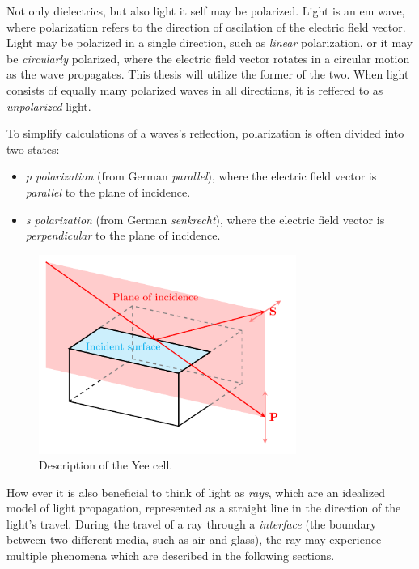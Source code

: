 Not only dielectrics, but also light it self may be polarized. Light is an \gls{em} wave, where polarization refers to the direction of oscilation of the electric field vector. Light may be polarized in a single direction, such as \emph{linear} polarization, or it may be \emph{circularly} polarized, where the electric field vector rotates in a circular motion as the wave propagates. This thesis will utilize the former of the two. When light consists of equally many polarized waves in all directions, it is reffered to as \emph{unpolarized} light. 

To simplify calculations of a waves's reflection, polarization is often divided into two states:
\begin{itemize}
  \item \emph{p polarization} (from German \emph{parallel}), where the electric field vector is \emph{parallel} to the plane of incidence.
  \item \emph{s polarization} (from German \emph{senkrecht}), where the electric field vector is \emph{perpendicular} to the plane of incidence.
\end{itemize}

\begin{figure}[H]\label{fig:polarization}
  \centering
  \includegraphics[width=0.75\textwidth]{figures/polarization.pdf}
  \caption{Description of the Yee cell.}
\end{figure}


How ever it is also beneficial to think of light as \emph{rays}, which are an idealized model of light propagation, represented as a straight line in the direction of the light's travel. During the travel of a ray through a \emph{interface} (the boundary between two different media, such as air and glass), the ray may experience multiple phenomena which are described in the following sections.



